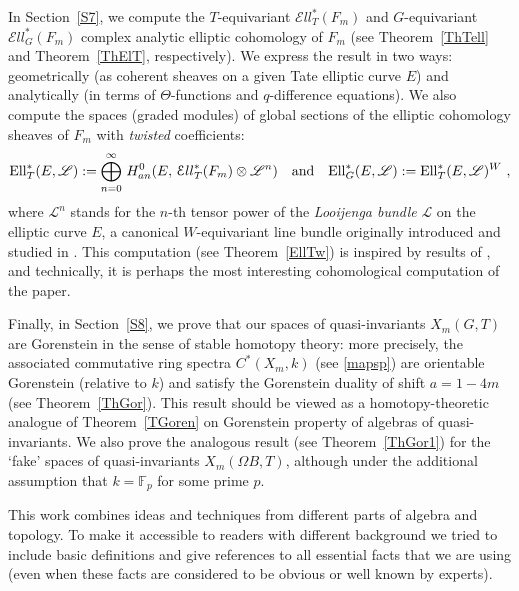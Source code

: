 \documentclass[11pt]{amsart}
\theoremstyle{definition}
\theoremstyle{remark}
\numberwithin{equation}{section}
\def\F{\mathbb F}
\def\Ell{\mathcal{E}{ll}}
\def\ELL{\mathrm{Ell}}
\begin{document}
In Section~\ref{S7},  we compute the $T$-equivariant $ \Ell_T^*(F_m) $ and $G$-equivariant $\Ell_G^*(F_m) $ complex analytic elliptic cohomology of $F_m$  (see Theorem~\ref{ThTell} and Theorem~\ref{ThElT}, respectively). We express the result in two ways: geometrically (as coherent sheaves on a given Tate elliptic curve $E$) and analytically (in terms of $\Theta$-functions and $q$-difference equations). We also compute the spaces (graded modules) of global sections of the elliptic cohomology sheaves of $F_m$ with {\it twisted} coefficients:
%
$$
\ELL_T^*(E, {\mathscr L}) :=
\bigoplus_{n=0}^{\infty}\, H_{\rm an}^0(E,\,\Ell_T^*(F_m) \otimes {\mathscr L}^{n})\quad 
\mbox{and}\quad  
\ELL_G^*(E, {\mathscr L}) := \ELL_T^*(E, {\mathscr L})^W\ ,
$$
%
where $ {\mathscr L}^n $ stands for the $n$-th tensor power of the {\it Looijenga bundle} ${\mathscr L}$ on the elliptic curve $E$, a canonical $W$-equivariant line bundle originally introduced and studied in \cite{Lo77}. This computation (see Theorem~\ref{EllTw}) is inspired by results of \cite{Ga14}, and technically, it is perhaps the most interesting cohomological computation of the paper.


Finally, in Section~\ref{S8}, we prove that our spaces of quasi-invariants $ X_m(G,T) $ are Gorenstein in the sense of stable homotopy theory: more precisely, the associated commutative ring spectra $ C^*(X_m, k) $ (see \eqref{mapsp}) are orientable Gorenstein (relative to $k$) and satisfy the Gorenstein duality of shift $ a = 1 - 4m $ (see Theorem~\ref{ThGor}). This result should be viewed as a homotopy-theoretic analogue of Theorem~\ref{TGoren} on Gorenstein property of algebras of quasi-invariants. We also prove the analogous result 
(see Theorem~\ref{ThGor1}) for the `fake' spaces of quasi-invariants $ X_m(\Omega B,T) $, although under the additional assumption that $ k = \F_p $ for some prime $p$. 

This work combines ideas and techniques from different parts of algebra and 
topology. To make it accessible to readers with different background we 
tried to include basic definitions and give references to all essential facts 
that we are using (even when these facts are considered to be obvious or well 
known by experts).
\end{document}
